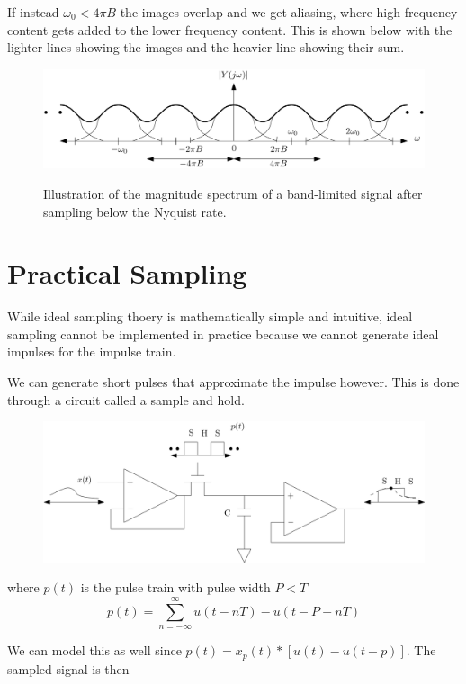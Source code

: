 \documentclass{article}
\begin{document}
If instead $\omega_0 < 4\pi B$ the images overlap and we get aliasing, where high frequency content gets added to the lower frequency content. This is shown below with the lighter lines showing the images and the heavier line showing their sum.

\begin{figure}
  \centering
  \includegraphics[width=0.8\linewidth, alt="the magnitude spectrum of a band-limited signal after sampling below the Nyquist rate"]{bandlimitedsampled2.svg}
  \caption{Illustration of the magnitude spectrum of a band-limited signal after sampling below the Nyquist rate.}
\end{figure}

\section{Practical Sampling}

While ideal sampling thoery is mathematically simple and intuitive, ideal sampling cannot be implemented in practice because we cannot generate ideal impulses for the impulse train.

We can generate short pulses that approximate the impulse however. This is done through a circuit called a sample and hold.

\begin{figure}
  \centering
  \includegraphics[width=0.8\linewidth, alt="schematic of a circuit implementing a sample and hold"]{sample_hold.svg}
\end{figure}
where $p(t)$ is the pulse train with pulse width $P < T$
\[
p(t) = \sum\limits_{n=-\infty}^{\infty} u(t-nT) - u(t-P-nT)
\]

We can model this as well since $p(t) = x_p(t) * \left[u(t) - u(t-p) \right]$. The sampled signal is then
\end{document}
